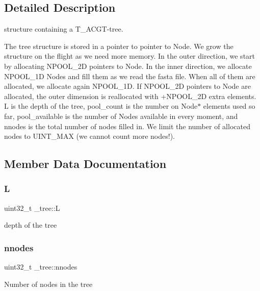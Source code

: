 \subsection{Detailed Description}
structure containing a T\+\_\+\+A\+C\+G\+T-\/tree. 

The tree structure is stored in a pointer to pointer to Node. We grow the structure on the flight as we need more memory. In the outer direction, we start by allocating N\+P\+O\+O\+L\+\_\+2D pointers to Node. In the inner direction, we allocate N\+P\+O\+O\+L\+\_\+1D Nodes and fill them as we read the fasta file. When all of them are allocated, we allocate again N\+P\+O\+O\+L\+\_\+1D. If N\+P\+O\+O\+L\+\_\+2D pointers to Node are allocated, the outer dimension is reallocated with +\+N\+P\+O\+O\+L\+\_\+2D extra elements. L is the depth of the tree, pool\+\_\+count is the number on Node$\ast$ elements used so far, pool\+\_\+available is the number of Nodes available in every moment, and nnodes is the total number of nodes filled in. We limit the number of allocated nodes to U\+I\+N\+T\+\_\+\+M\+AX (we cannot count more nodes!). 

\subsection{Member Data Documentation}
\mbox{\label{struct__tree_a36ca6c909dd7c119452da0cb49e2c829}} 
\subsubsection{\texorpdfstring{L}{L}}
{\footnotesize\ttfamily uint32\+\_\+t \+\_\+tree\+::L}

depth of the tree \mbox{\label{struct__tree_abffdcd9dcf0df92df4b5444fb74cc523}} 
\subsubsection{\texorpdfstring{nnodes}{nnodes}}
{\footnotesize\ttfamily uint32\+\_\+t \+\_\+tree\+::nnodes}

Number of nodes in the tree \mbox{\label{struct__tree_a2783a2aaf32fc3b3c9de8b9fbb14de58}} 
